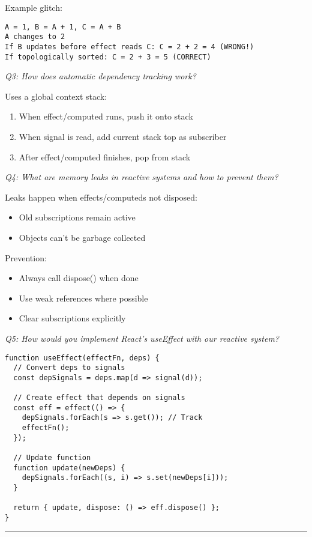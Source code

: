 \documentclass[11pt]{article}
\begin{document}
Example glitch:
\begin{verbatim}
A = 1, B = A + 1, C = A + B
A changes to 2
If B updates before effect reads C: C = 2 + 2 = 4 (WRONG!)
If topologically sorted: C = 2 + 3 = 5 (CORRECT)
\end{verbatim}

\emph{Q3: How does automatic dependency tracking work?}

Uses a global context stack:
\begin{enumerate}
\item When effect/computed runs, push it onto stack
\item When signal is read, add current stack top as subscriber
\item After effect/computed finishes, pop from stack
\end{enumerate}

\emph{Q4: What are memory leaks in reactive systems and how to prevent them?}

Leaks happen when effects/computeds not disposed:
\begin{itemize}
\item Old subscriptions remain active
\item Objects can't be garbage collected
\end{itemize}

Prevention:
\begin{itemize}
\item Always call dispose() when done
\item Use weak references where possible
\item Clear subscriptions explicitly
\end{itemize}

\emph{Q5: How would you implement React's useEffect with our reactive system?}

\begin{verbatim}
function useEffect(effectFn, deps) {
  // Convert deps to signals
  const depSignals = deps.map(d => signal(d));
  
  // Create effect that depends on signals
  const eff = effect(() => {
    depSignals.forEach(s => s.get()); // Track
    effectFn();
  });
  
  // Update function
  function update(newDeps) {
    depSignals.forEach((s, i) => s.set(newDeps[i]));
  }
  
  return { update, dispose: () => eff.dispose() };
}
\end{verbatim}

\noindent\rule{\textwidth}{0.5pt}
\end{document}
